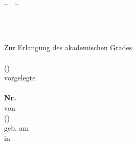 \thispagestyle{empty}

\begin{titlepage}

  \vspace*{-2.5cm}
  \begin{center}
  \end{center}

  \begin{center}
    \vspace{0.1cm}
    \LARGE \textbf{\University}\\
    \vspace{0.3cm}
    \Large --~\Faculty~--\\
    \Large --~\StudyCourse~--

    \vspace{1cm}

    \huge \textbf{\Title}\\

    \vspace{1cm}

    \Large Zur Erlangung des akademischen Grades \\
    \vspace{0.3cm}
    \LARGE \textbf{\Degree} \\
    (\DegreeShort) \\
    \vspace{0.3cm}
    \Large vorgelegte \\
    \vspace{0.3cm}
    \LARGE \textbf{\DocName} \\
    \Large \textbf{Nr.~\DocNr} \\
    \vspace{0.3cm}
    \Large von \\
    \vspace{0.3cm}
    \Large \textbf{\Name} (\Id)\\
    \Large geb. am \DateOfBirth \\
    in \PlaceOfBirth \\
  \end{center}


\end{titlepage}
